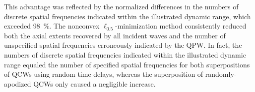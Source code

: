 This advantage was reflected by
the normalized differences in
the numbers of
discrete spatial frequencies indicated within
the illustrated dynamic range, which exceeded
\SI{98}{\percent}.
The nonconvex $\ell_{0.5}$-minimization method
 consistently reduced both
the axial extents recovered by
all incident waves and
the number of
unspecified spatial frequencies erroneously indicated by
the \ac{QPW}.
In fact,
the numbers of
discrete spatial frequencies indicated within
the illustrated dynamic range equaled
the number of
specified spatial frequencies for both
superpositions of
\acp{QCW} using
random time delays, whereas
the superposition of
randomly-apodized \acp{QCW} only caused
a negligible increase.
